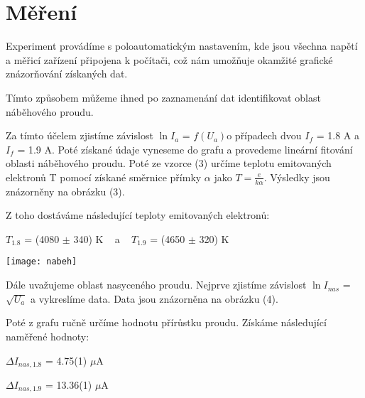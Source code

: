 \documentclass[a4paper,11pt]{article}
\begin{document}
    \hspace{10pt}
    \begin{minipage}[t]{0.5\textwidth} 
        \section{Měření}  
                Experiment provádíme s poloautomatickým nastavením, kde jsou všechna napětí a měřicí zařízení připojena k počítači, což nám umožňuje okamžité grafické znázorňování získaných dat.
                \par Tímto způsobem můžeme ihned po zaznamenání dat identifikovat oblast náběhového proudu.
                \par Za tímto účelem zjistíme závislost $\ln I_a$ = $f(U_a)$o případech dvou $I_f$ = 1.8 A a $I_f$ = 1.9 A. Poté získané údaje vyneseme do grafu a provedeme lineární fitování oblasti náběhového proudu. Poté ze vzorce (3) určíme teplotu emitovaných elektronů T pomocí získané směrnice přímky $\alpha$ jako $T = \frac{e}{k \alpha}$. Výsledky jsou znázorněny na obrázku (3).
                \par Z toho dostáváme následující teploty emitovaných elektronů: 
                \begin{center}
                    $T_{1.8}$ = (4080 $\pm$ 340) K ~ a ~ $T_{1.9}$ = (4650 $\pm$ 320) K
                \end{center}
                
                \vspace{10pt}           
                \par \centering
                \texttt{[image: nabeh]}
                \captionsetup{justification=centering, font=footnotesize}
                \label{fig:dif}
                \vspace{10pt}
                \raggedright 

                \par Dále uvažujeme oblast nasyceného proudu. Nejprve zjistíme závislost $\ln I_{nas}$ = $\sqrt{U_a}$ a vykreslíme data. Data jsou znázorněna na obrázku (4). 
                \par Poté z grafu ručně určíme hodnotu přírůstku proudu. Získáme následující naměřené hodnoty: 
                \begin{center}
                    $\Delta I_{nas, 1.8}$ = 4.75(1) $\mu$A
                    \vspace{5pt}
                    \par $\Delta I_{nas, 1.9}$ = 13.36(1) $\mu$A
                \end{center}
    \end{minipage}
\end{document}
